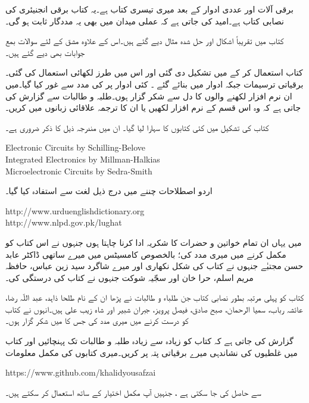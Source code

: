 \thispagestyle{empty}
برقی آلات اور عددی ادوار کے بعد  میری تیسری کتاب ہے۔یہ کتاب  برقی انجنیئری کی نصابی کتاب  ہے۔امید کی جاتی ہے کہ عملی میدان میں  بھی یہ مددگار ثابت ہو گی۔

کتاب میں تقریباً  اشکال اور  حل شدہ مثال دیے  گئے ہیں۔اس کے علاوہ  مشق کے لئے   سوالات  بمع جوابات بھی دیے گئے ہیں۔

کتاب  استعمال  کر کے   میں تشکیل دی گئی  اور اس میں    طرز    لکھائی  استعمال کی گئی۔برقیاتی ترسیمات   جبکہ ادوار  میں بنائے گئے  ۔ کئی ادوار پر  کی مدد سے غور کیا گیا۔میں ان نرم افزار لکھنے والوں کا دل سے شکر گزار ہوں۔طلبہ و طالبات سے گزارش   کی جاتی ہے  کہ وہ اس قسم کے نرم افزار لکھیں یا ان کا ترجمہ علاقائی زبانوں میں کریں۔

کتاب کی تشکیل میں کئی کتابوں کا سہارا لیا گیا۔ ان میں مندرجہ ذیل کا ذکر ضروری ہے۔

{
\begin{otherlanguage}{english}
Electronic Circuits by Schilling-Belove\\
Integrated Electronics by Millman-Halkias\\
Microelectronic Circuits by Sedra-Smith
\end{otherlanguage}
}

اردو اصطلاحات چننے میں درج ذیل لغت سے استفادہ  کیا گیا۔ 

{
\begin{otherlanguage}{english}
http:/\!\!/www.urduenglishdictionary.org\\
http:/\!\!/www.nlpd.gov.pk/lughat
\end{otherlanguage}
}

میں یہاں ان تمام خواتین و حضرات کا شکریہ ادا کرنا چاہتا ہوں جنہوں نے اس کتاب کو مکمل کرنے میں میری مدد کی؛ بالخصوص کامسیٹس میں میرے ساتھی ڈاکٹر عابد حسن مجتبٰے جنہوں نے کتاب کی شکل نکھاری اور میرے شاگرد سید زین عباس، حافظہ مریم اسلم، حرا خان اور  سجّیہ شوکت  جنہوں نے  کتاب کی درستگی کی۔ 

 کتاب کو پہلی مرتبہ بطور نصابی کتاب جن طلباء و طالبات نے پڑھا ان کے نام طلحا ذاہد، عبد اللّہ رضا، عائشہ رباب، سمیا الرحمان، صبح صادق، فیصل پرویز، جبران شبیر اور شاہ زیب علی ہیں۔انہوں نے کتاب کو درست کرنے میں میری مدد کی جس کا میں شکر گزار ہوں۔

 گزارش  کی جاتی ہے کہ   کتاب کو زیادہ سے زیادہ طلبہ و طالبات تک پہنچائیں اور کتاب میں غلطیوں کی نشاندہی میرے  برقیاتی پتہ      پر کریں۔میری  کتابوں کی مکمل  معلومات
 
{
\begin{otherlanguage}{english}
https:/\!\!/www.github.com/khalidyousafzai
\end{otherlanguage}
}
سے حاصل کی جا سکتی ہے ، جنہیں آپ مکمل اختیار کے ساتھ استعمال کر سکتے ہیں۔

\vspace{5mm}

{}

